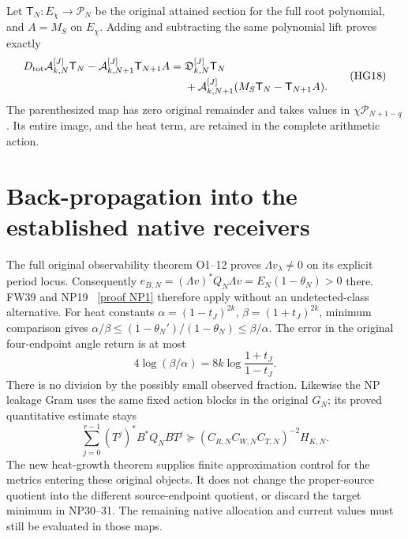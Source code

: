 \documentclass[11pt]{article}
\begin{document}
Let $\mathsf T_N:E_\chi\to\mathcal P_N$ be the original attained
section for the full root polynomial, and $A=M_S$ on $E_\chi$.
Adding and subtracting the same polynomial lift proves exactly
\[
 \begin{aligned}
 D_{\rm tot}\mathcal A_{k,N}^{[J]}\mathsf T_N
 -\mathcal A_{k,N+1}^{[J]}\mathsf T_{N+1}A
 ={}&\mathfrak D_{k,N}^{[J]}\mathsf T_N\\
 &+\mathcal A_{k,N+1}^{[J]}
       (M_S\mathsf T_N-\mathsf T_{N+1}A).
 \end{aligned}\tag{HG18}
\]
The parenthesized map has zero original remainder and takes values
in $\chi\mathcal P_{N+1-q}$. Its entire image, and the heat term,
are retained in the complete arithmetic action.

\section{Back-propagation into the established native receivers}
The full original observability theorem O1--12 \cite{native} proves
$\Lambda v_\lambda\ne0$ on its explicit period locus. Consequently
$e_{B,N}=(\Lambda v)^*Q_N\Lambda v=E_N(1-\theta_N)>0$ there.
FW39 and NP19 \cite{NP}%
~\href{https://github.com/KokunoYumeto/zeta-function-research-reader/blob/5992ad50c0f2a06921f1fcaded7b4e38097c0739/workbenches/splitzero-tandem/continuations/20260920-original-kernel-mixed-determinants/providers/NATIVE_PRECISION_AND_LEAKAGE.tex\#L36}{[proof NP1]}%
{} therefore apply without an undetected-class
alternative. For heat constants $\alpha=(1-t_J)^{2k}$,
$\beta=(1+t_J)^{2k}$, minimum comparison gives
$\alpha/\beta\le(1-\theta_N')/(1-\theta_N)\le\beta/\alpha$.
The error in the original four-endpoint angle return is at most
\[
 4\log(\beta/\alpha)=8k\log\frac{1+t_J}{1-t_J}.\tag{HG19}
\]
There is no division by the possibly small observed fraction.
Likewise the NP leakage Gram uses the same fixed action blocks in
the original $G_N$; its proved quantitative estimate stays
\[
 \sum_{j=0}^{r-1}(T^j)^*B^*Q_NBT^j
 \succeq(C_{R,N}C_{W,N}C_{T,N})^{-2}H_{K,N}.\tag{HG20}
\]
The new heat-growth theorem supplies finite approximation control for
the metrics entering these original objects. It does not change the
proper-source quotient into the different source-endpoint quotient,
or discard the target minimum in NP30--31. The remaining native
allocation and current values must still be evaluated in those maps.
\end{document}
